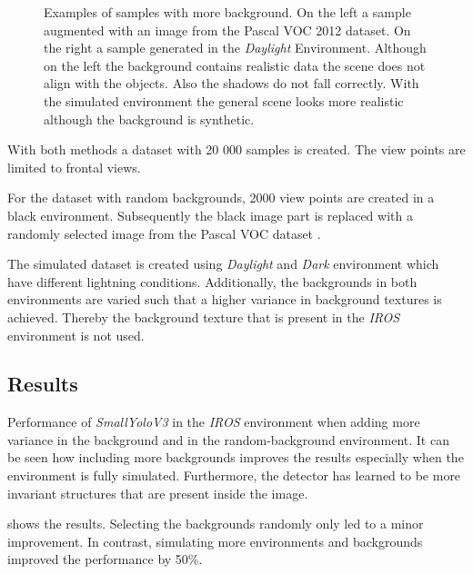 \begin{figure}
\begin{minipage}{0.3\textwidth}
	\end{minipage}
	\caption{Examples of samples with more background. On the left a sample augmented with an image from the Pascal VOC 2012 dataset. On the right a sample generated in the \textit{Daylight} Environment. Although on the left the background contains realistic data the scene does not align with the objects. Also the shadows do not fall correctly. With the simulated environment the general scene looks more realistic although the background is synthetic.}
	\label{fig:sim_vs_voc}
\end{figure}

With both methods a dataset with 20 000 samples is created. The view points are limited to frontal views.

For the dataset with random backgrounds, 2000 view points are created in a black environment. Subsequently the black image part is replaced with a randomly selected image from the Pascal VOC dataset \cite{Everingham2010}.

The simulated dataset is created using \textit{Daylight} and \textit{Dark} environment which have different lightning conditions. Additionally, the backgrounds in both environments are varied such that a higher variance in background textures is achieved. Thereby the background texture that is present in the \textit{IROS} environment is not used.


\subsection{Results}

\begin{table}[hbtp]
	\centering
	
	\caption{Performance of \textit{SmallYoloV3} in the \textit{IROS} environment when adding more variance in the background and in the random-background environment. It can be seen how including more backgrounds improves the results especially when the environment is fully simulated. Furthermore, the detector has learned to be more invariant structures that are present inside the image.}
	\label{tab:sim_vs_voc}
\end{table}

 shows the results. Selecting the backgrounds randomly only led to a minor improvement. In contrast, simulating more environments and backgrounds improved the performance by 50\%.

